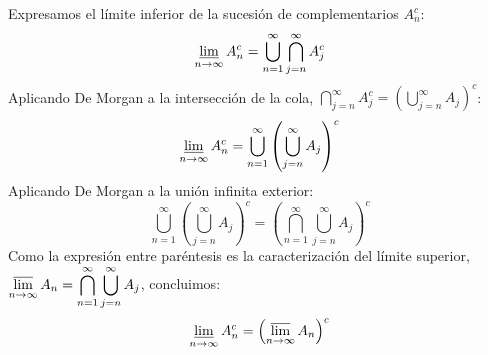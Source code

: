 \begin{problema}
\begin{enumerate}[label=\alph*)]
    Expresamos el límite inferior de la sucesión de complementarios $A_n^c$:
    \[
        \varliminf_{n \to \infty} A_n^c = \bigcup_{n=1}^\infty \bigcap_{j=n}^\infty A_j^c
    \]
    Aplicando De Morgan a la intersección de la cola, $\bigcap_{j=n}^\infty A_j^c = \left( \bigcup_{j=n}^\infty A_j \right)^c$:
    \[
        \varliminf_{n \to \infty} A_n^c = \bigcup_{n=1}^\infty \left( \bigcup_{j=n}^\infty A_j \right)^c
    \]
    Aplicando De Morgan a la unión infinita exterior:
    \[
        \bigcup_{n=1}^\infty \left( \bigcup_{j=n}^\infty A_j \right)^c = \left( \bigcap_{n=1}^\infty \bigcup_{j=n}^\infty A_j \right)^c
    \]
    Como la expresión entre paréntesis es la caracterización del límite superior, $\displaystyle \varlimsup_{n \to \infty} A_n = \bigcap_{n=1}^\infty \bigcup_{j=n}^\infty A_j$, concluimos:
    \[
        \varliminf_{n \to \infty} A_n^c = \left( \varlimsup_{n \to \infty} A_n \right)^c
    \]
\end{enumerate}
\end{problema}
\newpage
